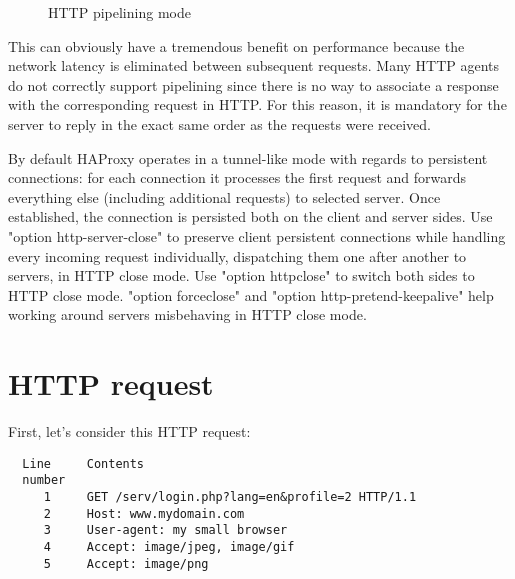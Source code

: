 \begin{figure}[p]
  \centering
  \caption{HTTP pipelining mode}
  \label{fig:http_pipelining}
\end{figure}

This can obviously have a tremendous benefit on performance because the network
latency is eliminated between subsequent requests. Many HTTP agents do not
correctly support pipelining since there is no way to associate a response with
the corresponding request in HTTP. For this reason, it is mandatory for the
server to reply in the exact same order as the requests were received.

By default HAProxy operates in a tunnel-like mode with regards to persistent
connections: for each connection it processes the first request and forwards
everything else (including additional requests) to selected server. Once
established, the connection is persisted both on the client and server
sides. Use "option http-server-close" to preserve client persistent connections
while handling every incoming request individually, dispatching them one after
another to servers, in HTTP close mode. Use "option httpclose" to switch both
sides to HTTP close mode. "option forceclose" and "option
http-pretend-keepalive" help working around servers misbehaving in HTTP close
mode.


\section{HTTP request}
First, let's consider this HTTP request:
\begin{verbatim}
  Line     Contents
  number
     1     GET /serv/login.php?lang=en&profile=2 HTTP/1.1
     2     Host: www.mydomain.com
     3     User-agent: my small browser
     4     Accept: image/jpeg, image/gif
     5     Accept: image/png
\end{verbatim}

